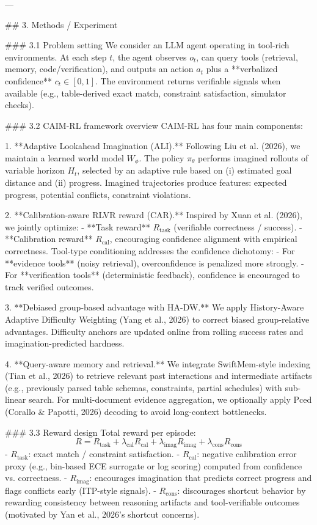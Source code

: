 ---

## 3. Methods / Experiment  

### 3.1 Problem setting  
We consider an LLM agent operating in tool-rich environments. At each step \(t\), the agent observes \(o_t\), can query tools (retrieval, memory, code/verification), and outputs an action \(a_t\) plus a **verbalized confidence** \(c_t \in [0,1]\). The environment returns verifiable signals when available (e.g., table-derived exact match, constraint satisfaction, simulator checks).

### 3.2 CAIM-RL framework overview  
CAIM-RL has four main components:

1. **Adaptive Lookahead Imagination (ALI).**  
   Following Liu et al. (2026), we maintain a learned world model \(W_\phi\). The policy \( \pi_\theta \) performs imagined rollouts of variable horizon \(H_t\), selected by an adaptive rule based on (i) estimated goal distance and (ii) progress. Imagined trajectories produce features: expected progress, potential conflicts, constraint violations.

2. **Calibration-aware RLVR reward (CAR).**  
   Inspired by Xuan et al. (2026), we jointly optimize:
   - **Task reward** \(R_{\text{task}}\) (verifiable correctness / success).  
   - **Calibration reward** \(R_{\text{cal}}\), encouraging confidence alignment with empirical correctness.  
   Tool-type conditioning addresses the confidence dichotomy:
   - For **evidence tools** (noisy retrieval), overconfidence is penalized more strongly.  
   - For **verification tools** (deterministic feedback), confidence is encouraged to track verified outcomes.

3. **Debiased group-based advantage with HA-DW.**  
   We apply History-Aware Adaptive Difficulty Weighting (Yang et al., 2026) to correct biased group-relative advantages. Difficulty anchors are updated online from rolling success rates and imagination-predicted hardness.

4. **Query-aware memory and retrieval.**  
   We integrate SwiftMem-style indexing (Tian et al., 2026) to retrieve relevant past interactions and intermediate artifacts (e.g., previously parsed table schemas, constraints, partial schedules) with sub-linear search. For multi-document evidence aggregation, we optionally apply Pced (Corallo & Papotti, 2026) decoding to avoid long-context bottlenecks.

### 3.3 Reward design  
Total reward per episode:
\[
R = R_{\text{task}} + \lambda_{\text{cal}} R_{\text{cal}} + \lambda_{\text{imag}} R_{\text{imag}} + \lambda_{\text{cons}} R_{\text{cons}}
\]
- \(R_{\text{task}}\): exact match / constraint satisfaction.  
- \(R_{\text{cal}}\): negative calibration error proxy (e.g., bin-based ECE surrogate or log scoring) computed from confidence vs. correctness.  
- \(R_{\text{imag}}\): encourages imagination that predicts correct progress and flags conflicts early (ITP-style signals).  
- \(R_{\text{cons}}\): discourages shortcut behavior by rewarding consistency between reasoning artifacts and tool-verifiable outcomes (motivated by Yan et al., 2026’s shortcut concerns).

